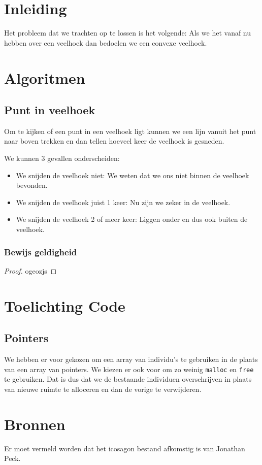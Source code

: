 \documentclass[11pt,a4paper]{article}
\begin{document}

\section{Inleiding}
\label{sec:inleiding}
Het probleem dat we trachten op te lossen is het volgende: %
Als we het vanaf nu hebben over een veelhoek dan bedoelen we een convexe veelhoek.


\section{Algoritmen}
\label{sec:algoritmen}

\subsection{Punt in veelhoek}
\label{sub:algo-pt-in-poly}
Om te kijken of een punt in een veelhoek ligt kunnen we een lijn vanuit het punt naar boven 
trekken en dan tellen hoeveel keer de veelhoek is gesneden.

We kunnen 3 gevallen onderscheiden:
\begin{itemize}
\item We snijden de veelhoek niet: We weten dat we ons niet binnen de veelhoek bevonden.
\item We snijden de veelhoek juist 1 keer: Nu zijn we zeker in de veelhoek. 
\item We snijden de veelhoek 2 of meer keer: Liggen onder en dus ook buiten de veelhoek.
\end{itemize}

\subsubsection{Bewijs geldigheid}
\begin{proof}
ogeozjs
\end{proof}



\section{Toelichting Code}
\label{sec:explainationcode}
\subsection{Pointers}
\label{sub:pointer}
We hebben er voor gekozen om een array van individu's te gebruiken in de plaats van een array van pointers. We kiezen er ook voor om zo weinig \texttt{malloc} en \texttt{free} te gebruiken. Dat is dus dat we de bestaande individuen overschrijven in plaats van nieuwe ruimte te alloceren en dan de vorige te verwijderen.


\section{Bronnen}
Er moet vermeld worden dat het icosagon bestand afkomstig is van Jonathan Peck. 
\end{document}
